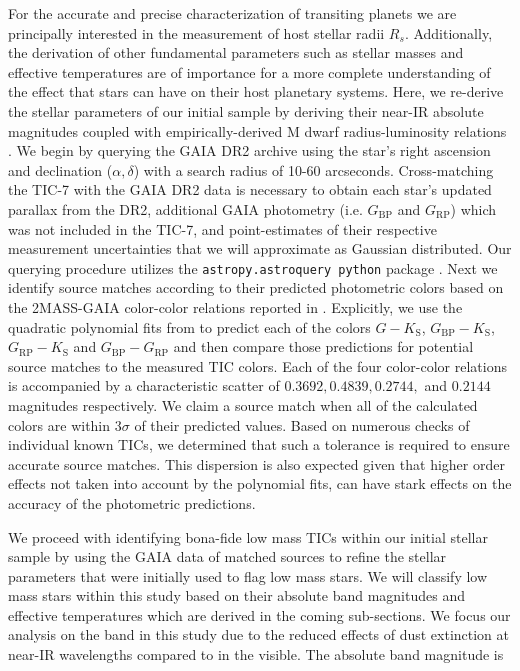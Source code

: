 For the accurate and precise characterization of transiting planets we are principally
interested in the measurement of host stellar radii $R_s$. Additionally, the derivation of other fundamental
parameters such as stellar masses and effective temperatures are of importance for a more complete understanding
of the effect that stars can have on their host planetary systems. Here, we re-derive
the stellar parameters of our initial sample by deriving their near-IR absolute magnitudes coupled with
empirically-derived M dwarf radius-luminosity relations \citep{mann15}. We begin by querying the GAIA DR2
archive using the star's right ascension and declination ($\alpha,\delta$) with a search radius of 10-60 arcseconds.
Cross-matching the TIC-7 with the GAIA DR2 data is necessary to obtain each star's updated parallax from the DR2,
additional GAIA photometry (i.e. $G_{\text{BP}}$ and $G_{\text{RP}}$) which was not included in the TIC-7,
and point-estimates of their respective measurement uncertainties that we will approximate as Gaussian distributed.
Our querying procedure utilizes the \texttt{astropy.astroquery python} package \citep{ginsburg17}.
Next we identify source matches according to their predicted photometric colors based on the 2MASS-GAIA
color-color relations reported in \cite{evans18}. Explicitly, we use the quadratic polynomial fits from
\cite{evans18} to predict each of the colors
$G-K_{\text{S}}$, $G_{\text{BP}}-K_{\text{S}}$, $G_{\text{RP}}-K_{\text{S}}$ and $G_{\text{BP}}-G_{\text{RP}}$ and then compare
those predictions for potential source matches to the measured TIC colors. Each of the four color-color
relations is accompanied by a characteristic scatter of $0.3692, 0.4839, 0.2744,$ and $0.2144$ magnitudes
respectively. We claim a source match when all of the calculated colors are within $3\sigma$ of their predicted
values. Based on numerous checks of individual known TICs, we determined
that such a tolerance is required to ensure accurate source matches. This dispersion is also expected given
that higher order effects not taken into account by the polynomial fits, can have stark effects on the accuracy
of the photometric predictions.

We proceed with identifying bona-fide low mass TICs within our initial stellar sample by using the GAIA data
of matched sources to refine the stellar parameters that were initially used to flag low mass stars. 
We will classify low mass stars within this study based on their absolute \Ks{-}band magnitudes
\citep{delfosse00,mann15,benedict16} and effective temperatures which are derived in the coming sub-sections.
We focus our analysis on the \Ks{-}band in this study due to the reduced effects of dust
extinction at near-IR wavelengths compared to in the visible. The absolute \Ks{-}band magnitude is

